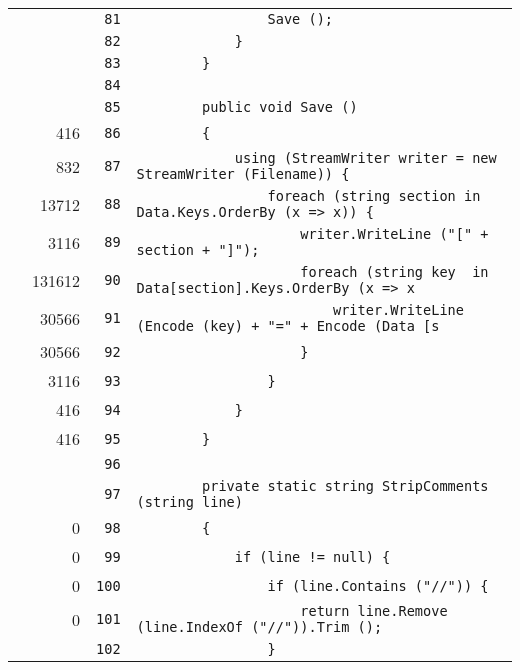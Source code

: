 \documentclass[a4paper,10pt]{article}
\begin{document}
\begin{longtable}[l]{lrrl}
\cellcolor{gray} &  & \verb~81~ & \verb~                Save ();~\\
\cellcolor{gray} &  & \verb~82~ & \verb~            }~\\
\cellcolor{gray} &  & \verb~83~ & \verb~        }~\\
\cellcolor{gray} &  & \verb~84~ & \verb~~\\
\cellcolor{gray} &  & \verb~85~ & \verb~        public void Save ()~\\
\cellcolor{green} & 416 & \verb~86~ & \verb~        {~\\
\cellcolor{green} & 832 & \verb~87~ & \verb~            using (StreamWriter writer = new StreamWriter (Filename)) {~\\
\cellcolor{green} & 13712 & \verb~88~ & \verb~                foreach (string section in Data.Keys.OrderBy (x => x)) {~\\
\cellcolor{green} & 3116 & \verb~89~ & \verb~                    writer.WriteLine ("[" + section + "]");~\\
\cellcolor{green} & 131612 & \verb~90~ & \verb~                    foreach (string key  in Data[section].Keys.OrderBy (x => x~\\
\cellcolor{green} & 30566 & \verb~91~ & \verb~                        writer.WriteLine (Encode (key) + "=" + Encode (Data [s~\\
\cellcolor{green} & 30566 & \verb~92~ & \verb~                    }~\\
\cellcolor{green} & 3116 & \verb~93~ & \verb~                }~\\
\cellcolor{green} & 416 & \verb~94~ & \verb~            }~\\
\cellcolor{green} & 416 & \verb~95~ & \verb~        }~\\
\cellcolor{gray} &  & \verb~96~ & \verb~~\\
\cellcolor{gray} &  & \verb~97~ & \verb~        private static string StripComments (string line)~\\
\cellcolor{red} & 0 & \verb~98~ & \verb~        {~\\
\cellcolor{red} & 0 & \verb~99~ & \verb~            if (line != null) {~\\
\cellcolor{red} & 0 & \verb~100~ & \verb~                if (line.Contains ("//")) {~\\
\cellcolor{red} & 0 & \verb~101~ & \verb~                    return line.Remove (line.IndexOf ("//")).Trim ();~\\
\cellcolor{gray} &  & \verb~102~ & \verb~                }~\\

\end{longtable}
\end{document}
